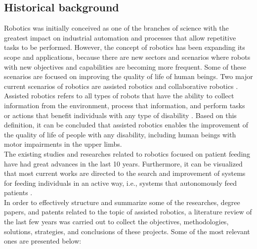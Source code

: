 \documentclass[11pt]{report} %
\begin{document}
\subsection{Historical background}

Robotics was initially conceived as one of the branches of science with the greatest impact on industrial automation and processes that allow repetitive tasks to be performed. However, the concept of robotics has been expanding its scope and applications, because there are new sectors and scenarios where robots with new objectives and capabilities are becoming more frequent. Some of these scenarios are focused on improving the quality of life of human beings. Two major current scenarios of robotics are assisted robotics and collaborative robotics \citep{cite_service_robotics_and_human_labor}.\\

Assisted robotics refers to all types of robots that have the ability to collect information from the environment, process that information, and perform tasks or actions that benefit individuals with any type of disability \citep{cite_assited_robotics_stanford_lecture_jaffe}. Based on this definition, it can be concluded that assisted robotics enables the improvement of the quality of life of people with any disability, including human beings with motor impairments in the upper limbs.\\

The existing studies and researches related to robotics focused on patient feeding have had great advances in the last 10 years. Furthermore, it can be visualized that most current works are directed to the search and improvement of systems for feeding individuals in an active way, i.e., systems that autonomously feed patients \citep{cite_park_active_robot_assisted_feeding}.\\

In order to effectively structure and summarize some of the researches, degree papers, and patents related to the topic of assisted robotics, a literature review of the last few years was carried out to collect the objectives, methodologies, solutions, strategies, and conclusions of these projects. Some of the most relevant ones are presented below:\\
\end{document}
